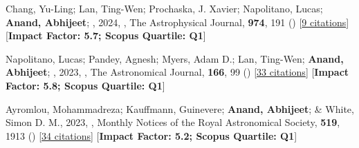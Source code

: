 \item[{\color{numcolor}\scriptsize3}] Chang, Yu-Ling; Lan, Ting-Wen; Prochaska, J. Xavier; Napolitano, Lucas; \textbf{Anand, Abhijeet}; \etal, 2024, , The Astrophysical Journal, \textbf{974}, 191 () [\href{https://ui.adsabs.harvard.edu/abs/2024ApJ...974..191C}{9 citations}] [\textbf{Impact Factor: 5.7; Scopus Quartile: Q1}]

\item[{\color{numcolor}\scriptsize2}] Napolitano, Lucas; Pandey, Agnesh; Myers, Adam D.; Lan, Ting-Wen; \textbf{Anand, Abhijeet}; \etal, 2023, , The Astronomical Journal, \textbf{166}, 99 () [\href{https://ui.adsabs.harvard.edu/abs/2023AJ....166...99N}{33 citations}] [\textbf{Impact Factor: 5.8; Scopus Quartile: Q1}]

\item[{\color{numcolor}\scriptsize1}] Ayromlou, Mohammadreza; Kauffmann, Guinevere; \textbf{Anand, Abhijeet}; \& White, Simon D. M., 2023, , Monthly Notices of the Royal Astronomical Society, \textbf{519}, 1913 () [\href{https://ui.adsabs.harvard.edu/abs/2023MNRAS.519.1913A}{34 citations}] [\textbf{Impact Factor: 5.2; Scopus Quartile: Q1}]